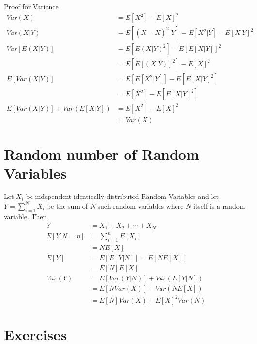 \documentclass[11pt, a4paper]{article}
\begin{document}
    Proof for Variance
    \begin{align*}
        Var(X) &= E[X^{2}] - E[X]^{2} \\
        Var(X|Y) &= E[(X-\overline{X})^{2}|Y] = E[X^{2}|Y] - E[X|Y]^{2} \tag*{1}\\
        Var[E(X|Y)] &= E[E(X|Y)^{2}] - E[E[X|Y]]^{2}\\
                    &= E[E[(X|Y)]^{2}] - E[X]^{2} \tag*{2}\\
        E[Var(X|Y)] &= E[E[X^{2}|Y]] - E[E[X|Y]^{2}] \tag*{from 1}\\
                    &= E[X^{2}] - E[E[X|Y]^{2}] \tag*{3}\\
        E[Var(X|Y)] + Var(E[X|Y]) &= E[X^{2}] - E[X]^{2} \tag*{adding 2 and 3}\\
                                    &= Var(X)
    \end{align*}

    \section{Random number of Random Variables}
    Let $X_{i}$ be independent identically distributed Random Variables and let $Y = \sum_{i=1}^{N} X_{i}$ be the sum of $N$ such random variables where $N$ itself is a random variable. Then,
    \begin{align*}
        Y &= X_{1} + X_{2} + \cdots + X_{N}\\
        E[Y|N=n] &= \sum_{i=1}^{n}E[X_{i}]\\
                &= NE[X]\\
        E[Y] &= E[E[Y|N]] = E[NE[X]]\\
            &= E[N]E[X] \tag*{since $E[X]$ will be a number}\\
        Var(Y) &= E[Var(Y|N)] + Var(E[Y|N])\\
            &= E[NVar(X)] + Var(NE[X])\\
            &= E[N]Var(X) + E[X]^{2}Var(N)
    \end{align*}

    

    
    

    

    \section{Exercises}
    

    
\end{document}
